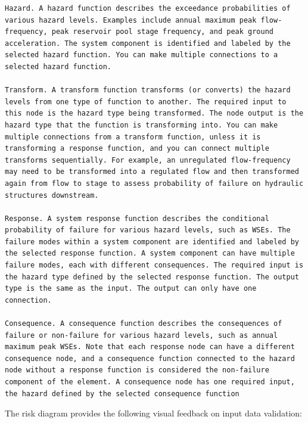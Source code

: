 \documentclass[
]{book}
\begin{document}
\begin{verbatim}
Hazard. A hazard function describes the exceedance probabilities of various hazard levels. Examples include annual maximum peak flow-frequency, peak reservoir pool stage frequency, and peak ground acceleration. The system component is identified and labeled by the selected hazard function. You can make multiple connections to a selected hazard function.

Transform. A transform function transforms (or converts) the hazard levels from one type of function to another. The required input to this node is the hazard type being transformed. The node output is the hazard type that the function is transforming into. You can make multiple connections from a transform function, unless it is transforming a response function, and you can connect multiple transforms sequentially. For example, an unregulated flow-frequency may need to be transformed into a regulated flow and then transformed again from flow to stage to assess probability of failure on hydraulic structures downstream.

Response. A system response function describes the conditional probability of failure for various hazard levels, such as WSEs. The failure modes within a system component are identified and labeled by the selected response function. A system component can have multiple failure modes, each with different consequences. The required input is the hazard type defined by the selected response function. The output type is the same as the input. The output can only have one connection.

Consequence. A consequence function describes the consequences of failure or non-failure for various hazard levels, such as annual maximum peak WSEs. Note that each response node can have a different consequence node, and a consequence function connected to the hazard node without a response function is considered the non-failure component of the element. A consequence node has one required input, the hazard defined by the selected consequence function
\end{verbatim}

The risk diagram provides the following visual feedback on input data validation:
\end{document}
